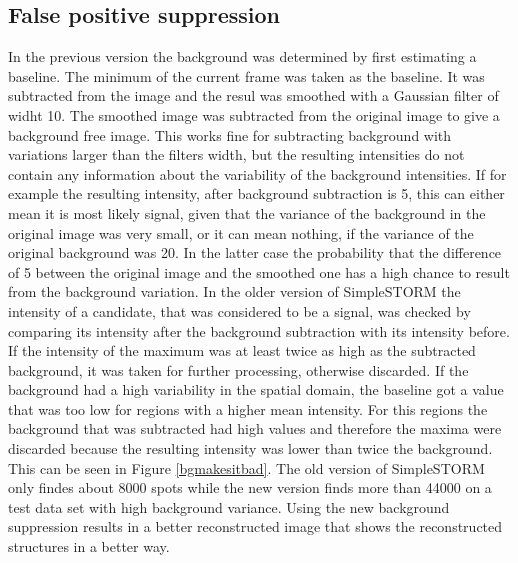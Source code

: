 \subsection{False positive suppression}
In the previous version the background was determined by first estimating a baseline. The minimum of the current frame was taken as the baseline. It was subtracted from the image and the resul was smoothed with a Gaussian filter of widht 10. The smoothed image was subtracted from the original image to give a background free image. This works fine for subtracting background with variations larger than the filters width, but the resulting intensities do not contain any information about the variability of the background intensities.\newline
If for example the resulting intensity, after background subtraction is 5, this can either mean it is most likely signal, given that the variance of the background in the original image was very small, or it can mean nothing, if the variance of the original background was 20. In the latter case the probability that the difference of 5 between the original image and the smoothed one has a high chance to result from the background variation.\newline
In the older version of SimpleSTORM the intensity of a candidate, that was considered to be a signal, was checked by comparing its intensity after the background subtraction with its intensity before. If the intensity of the maximum was at least twice as high as the subtracted background, it was taken for further processing, otherwise discarded. If the background had a high variability in the spatial domain, the baseline got a value that was too low for regions with a higher mean intensity. For this regions the background that was subtracted had high values and therefore the maxima were discarded because the resulting intensity was lower than twice the background. This can be seen in Figure \ref{bgmakesitbad}. The old version of SimpleSTORM only findes about 8000 spots while the new version finds more than 44000 on a test data set with high background variance. Using the new background suppression results in a better reconstructed image that shows the reconstructed structures in a better way.


